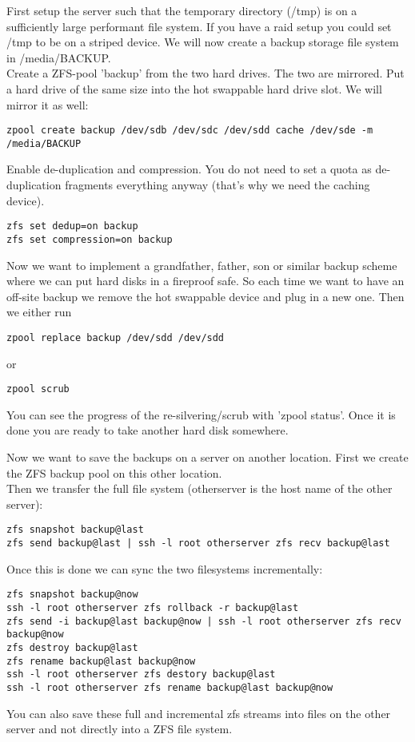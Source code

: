 \documentclass[a4paper,10pt]{article} \usepackage[breaklinks=true]{hyperref}
\begin{document}
First setup the server such that the temporary directory (/tmp) is on a sufficiently large performant file system. If you have a raid setup you could set /tmp to be on a striped device. We will now create a backup storage file system in /media/BACKUP.\\
Create a ZFS-pool 'backup' from the two hard drives. The two are mirrored. Put a hard drive of the same size into the hot swappable hard drive slot. We will mirror it as well:
\begin{verbatim}
zpool create backup /dev/sdb /dev/sdc /dev/sdd cache /dev/sde -m /media/BACKUP
\end{verbatim}
Enable de-duplication and compression. You do not need to set a quota as de-duplication fragments everything anyway (that's why we need the caching device).
\begin{verbatim}
zfs set dedup=on backup
zfs set compression=on backup
\end{verbatim}
Now we want to implement a grandfather, father, son or similar backup scheme where we can put hard disks in a fireproof safe. So each time we want to have an off-site backup we remove the hot swappable device and plug in a new one. Then we either run
\begin{verbatim}
zpool replace backup /dev/sdd /dev/sdd
\end{verbatim}
or
\begin{verbatim}
zpool scrub
\end{verbatim}
You can see the progress of the re-silvering/scrub with 'zpool status'. Once it is done you are ready to take another hard disk somewhere.

Now we want to save the backups on a server on another location. First we create the ZFS backup pool on this other location.\\
Then we transfer the full file system (otherserver is the host name of the other server):
\begin{verbatim}
zfs snapshot backup@last
zfs send backup@last | ssh -l root otherserver zfs recv backup@last
\end{verbatim}
Once this is done we can sync the two filesystems incrementally:
\begin{verbatim}
zfs snapshot backup@now
ssh -l root otherserver zfs rollback -r backup@last
zfs send -i backup@last backup@now | ssh -l root otherserver zfs recv backup@now
zfs destroy backup@last
zfs rename backup@last backup@now
ssh -l root otherserver zfs destory backup@last
ssh -l root otherserver zfs rename backup@last backup@now
\end{verbatim}
You can also save these full and incremental zfs streams into files on the other server and not directly into a ZFS file system.
\end{document}
